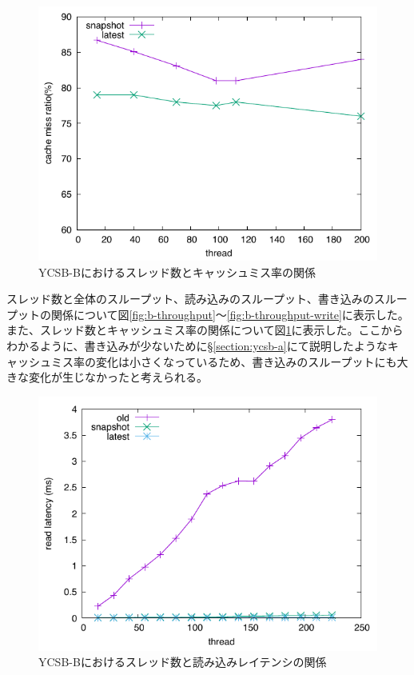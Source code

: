 \documentclass[a4paper]{jreport}	%
\begin{document}
\begin{figure}[h] 
\centering
\includegraphics[width=15cm]{cache-b}
\caption{YCSB-Bにおけるスレッド数とキャッシュミス率の関係}
\label{fig:b-cache}
\end{figure}


スレッド数と全体のスループット、読み込みのスループット、書き込みのスループットの関係について図\ref{fig:b-throughput}〜\ref{fig:b-throughput-write}に表示した。また、スレッド数とキャッシュミス率の関係について図\ref{fig:b-cache}に表示した。ここからわかるように、書き込みが少ないために§\ref{section:ycsb-a}にて説明したようなキャッシュミス率の変化は小さくなっているため、書き込みのスループットにも大きな変化が生じなかったと考えられる。

\begin{figure}[h] 
\centering
\includegraphics[width=15cm]{ycsb-b/opposite-read-latency}
\caption{YCSB-Bにおけるスレッド数と読み込みレイテンシの関係}
\label{fig:b-read-latency}
\end{figure}
\end{document}
